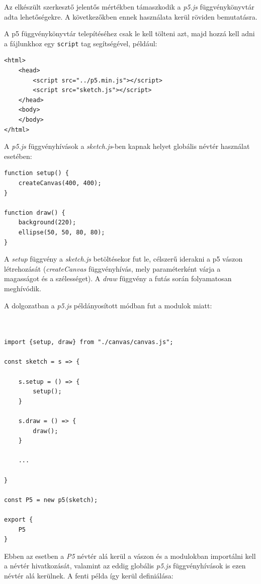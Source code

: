

Az elkészült szerkesztő jelentős mértékben támaszkodik a \textit{p5.js} függvénykönyvtár adta lehetőségekre. A következőkben ennek használata kerül röviden bemutatásra.


A p5 függvénykönyvtár telepítéséhez csak le kell tölteni azt, majd hozzá kell adni a fájlunkhoz egy \lstinline[style=html]|script| tag segítségével, például:

\begin{lstlisting}[style=html]
<html>
	<head>
		<script src="../p5.min.js"></script>
		<script src="sketch.js"></script>
	</head>
	<body>
	</body>
</html>
\end{lstlisting}

A \textit{p5.js} függvényhívások a \textit{sketch.js}-ben kapnak helyet globális névtér használat esetében:

\begin{lstlisting}[style=es6]
function setup() {
	createCanvas(400, 400);
}

function draw() {
	background(220);
	ellipse(50, 50, 80, 80);
}
\end{lstlisting}

A \textit{setup} függvény a \textit{sketch.js} betöltésekor fut le, célszerű iderakni a p5 vászon létrehozását (\textit{createCanvas} függvényhívás, mely paraméterként várja a magasságot és a szélességet). A \textit{draw} függvény a futás során folyamatosan meghívódik.

A dolgozatban a \textit{p5.js} példányosított módban fut a modulok miatt:

\begin{lstlisting}[style=es6, morekeywords={P5}]


import {setup, draw} from "./canvas/canvas.js";	

const sketch = s => {
	
	s.setup = () => {
		setup();
	}
	
	s.draw = () => {
		draw();
	}

    ...

}

const P5 = new p5(sketch);

export {
	P5
}
\end{lstlisting}

Ebben az esetben a \textit{P5} névtér alá kerül a vászon és a modulokban importálni kell a névtér hivatkozását, valamint az eddig globális \textit{p5.js} függvényhívások is ezen névtér alá kerülnek. A fenti példa így kerül definiálása:

